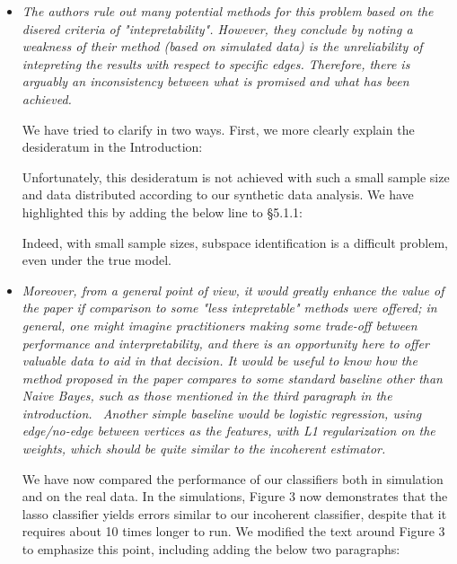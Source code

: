 \documentclass[11pt]{article}
\begin{document}
\begin{itemize}
	\item \emph{The authors rule out many potential methods for this problem based on the disered criteria of "intepretability". However, they conclude by noting a weakness of their method (based on simulated data) is the unreliability of intepreting the results with respect to specific edges. Therefore, there is arguably an inconsistency between what is promised and what has been achieved.}
			
	We have tried to clarify in two ways.  First, we more clearly explain the desideratum in the Introduction:
	
	
	Unfortunately, this desideratum is not achieved with such a small sample size and data distributed according to our synthetic data analysis.  We have highlighted this by adding the below line to \S 5.1.1:
		

Indeed, with small sample sizes, subspace identification is a difficult problem, even under the true model. 


	\item \emph{Moreover, from a general point of view, it would greatly enhance the value of the paper if comparison to some "less intepretable" methods were offered; in general, one might imagine practitioners making some trade-off between performance and interpretability, and there is an opportunity here to offer valuable data to aid in that decision. It would be useful to know how the method proposed in the paper compares to some standard baseline other than Naive Bayes, such as those mentioned in the third paragraph in the introduction.  Another simple baseline would be logistic regression, using edge/no-edge between vertices as the features, with L1 regularization on the weights, which should be quite similar to the incoherent estimator.}
	
	We have now compared the performance of our classifiers both in simulation and on the real data.  In the simulations, Figure 3 now demonstrates that the lasso classifier yields errors similar to our incoherent classifier, despite that it requires about 10 times longer to run.  We modified the text around Figure 3 to emphasize this point, including adding the below two paragraphs:
	

\end{itemize}
\end{document}
